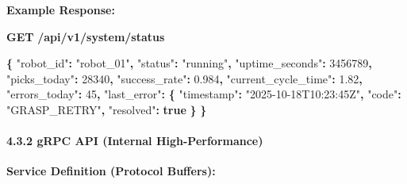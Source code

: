 \documentclass[
]{article}
\newenvironment{Shaded}{\begin{snugshade}}{\end{snugshade}}
\newcommand{\DataTypeTok}[1]{\textcolor[rgb]{0.13,0.29,0.53}{#1}}
\newcommand{\DecValTok}[1]{\textcolor[rgb]{0.00,0.00,0.81}{#1}}
\newcommand{\ErrorTok}[1]{\textcolor[rgb]{0.64,0.00,0.00}{\textbf{#1}}}
\newcommand{\FloatTok}[1]{\textcolor[rgb]{0.00,0.00,0.81}{#1}}
\newcommand{\FunctionTok}[1]{\textcolor[rgb]{0.13,0.29,0.53}{\textbf{#1}}}
\newcommand{\KeywordTok}[1]{\textcolor[rgb]{0.13,0.29,0.53}{\textbf{#1}}}
\newcommand{\StringTok}[1]{\textcolor[rgb]{0.31,0.60,0.02}{#1}}
\begin{document}
\textbf{Example Response:}

\begin{Shaded}
\begin{Highlighting}[]
\ErrorTok{GET} \ErrorTok{/api/v1/system/status}

\FunctionTok{\{}
  \DataTypeTok{"robot\_id"}\FunctionTok{:} \StringTok{"robot\_01"}\FunctionTok{,}
  \DataTypeTok{"status"}\FunctionTok{:} \StringTok{"running"}\FunctionTok{,}
  \DataTypeTok{"uptime\_seconds"}\FunctionTok{:} \DecValTok{3456789}\FunctionTok{,}
  \DataTypeTok{"picks\_today"}\FunctionTok{:} \DecValTok{28340}\FunctionTok{,}
  \DataTypeTok{"success\_rate"}\FunctionTok{:} \FloatTok{0.984}\FunctionTok{,}
  \DataTypeTok{"current\_cycle\_time"}\FunctionTok{:} \FloatTok{1.82}\FunctionTok{,}
  \DataTypeTok{"errors\_today"}\FunctionTok{:} \DecValTok{45}\FunctionTok{,}
  \DataTypeTok{"last\_error"}\FunctionTok{:} \FunctionTok{\{}
    \DataTypeTok{"timestamp"}\FunctionTok{:} \StringTok{"2025{-}10{-}18T10:23:45Z"}\FunctionTok{,}
    \DataTypeTok{"code"}\FunctionTok{:} \StringTok{"GRASP\_RETRY"}\FunctionTok{,}
    \DataTypeTok{"resolved"}\FunctionTok{:} \KeywordTok{true}
  \FunctionTok{\}}
\FunctionTok{\}}
\end{Highlighting}
\end{Shaded}

\hypertarget{grpc-api-internal-high-performance}{%
\paragraph{4.3.2 gRPC API (Internal
High-Performance)}\label{grpc-api-internal-high-performance}}

\textbf{Service Definition (Protocol Buffers):}
\end{document}
